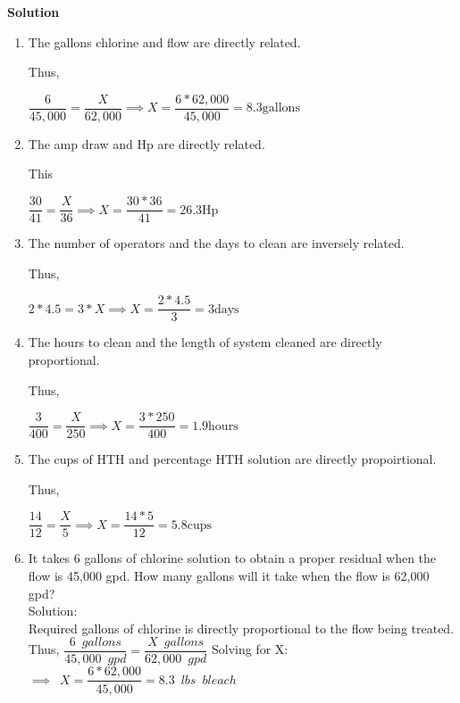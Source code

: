 \documentclass{article}
\begin{document}
\textbf{Solution}
\begin{enumerate}
\item The gallons chlorine and flow are directly related. 

Thus,

$\dfrac{6}{45,000}=\dfrac{X}{62,000} \implies X=\dfrac{6*62,000}{45,000}=8.3 \mathrm{gallons}$


\vspace{0.5cm}

\item The amp draw and Hp are directly related.

This

$\dfrac{30}{41}=\dfrac{X}{36} \implies X=\dfrac{30*36}{41}=26.3 \mathrm{Hp}$

\vspace{0.5cm}

\item The number of operators and the days to clean are inversely related.

Thus,

$2 * 4.5 = 3*X \implies X = \dfrac{2*4.5}{3} = 3 \mathrm{days}$



\vspace{0.5cm}

\item The hours to clean and the length of system cleaned are directly proportional.

Thus,

$\dfrac{3}{400}=\dfrac{X}{250} \implies X=\dfrac{3*250}{400}=1.9 \mathrm{hours}$

\vspace{0.5cm}

\item The cups of HTH and percentage HTH solution are directly propoirtional.

Thus,

$\dfrac{14}{12}=\dfrac{X}{5} \implies X=\dfrac{14*5}{12}=5.8 \mathrm{cups}$

\item It takes 6 gallons of chlorine solution to obtain a proper residual when the flow is 45,000 gpd. How many gallons will it take when the flow is 62,000 gpd?\\
\vspace{0.2cm}
Solution:\\
\vspace{0.2cm}
Required gallons of chlorine is directly proportional to the flow being treated.\\
\vspace{0.2cm}
Thus, $\dfrac{6 \enspace gallons}{45,000 \enspace gpd }=\dfrac{X \enspace gallons}{62,000 \enspace gpd}$
\vspace{0.2cm}
Solving for X:\\
\vspace{0.2cm}
$\implies \enspace X=\dfrac{6*62,000}{45,000}=\boxed{8.3 \enspace lbs \enspace bleach}$
\vspace{0.2cm}


\end{enumerate}
\end{document}
